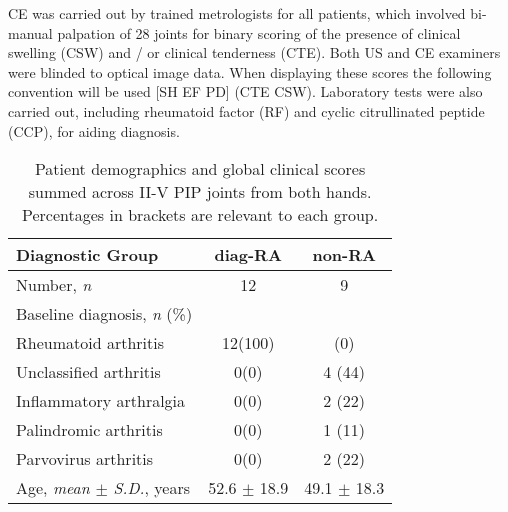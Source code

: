 \documentclass[twoside]{bhamthesis}
\theoremstyle{definition}
\begin{document}
CE was carried out by trained metrologists for all patients, which involved bi-manual palpation of 28 joints for binary scoring of the presence of clinical swelling (CSW) and / or clinical tenderness (CTE). Both US and CE examiners were blinded to optical image data. When displaying these scores the following convention will be used [SH EF PD] (CTE CSW). Laboratory tests were also carried out, including rheumatoid factor (RF) and cyclic citrullinated peptide (CCP), for aiding diagnosis.

\bgroup
\def\arraystretch{1.2}
\begin{table}[!ht]
  \footnotesize
\caption{Patient demographics and global clinical scores summed across II-V PIP joints from both hands. Percentages in brackets are relevant to each group.} 
\label{tab:participant_demographics}
\begin{center}       
\begin{tabular}{l c c} 
\hline
\textbf{Diagnostic Group} &\textbf{ diag-RA} & \textbf{non-RA} \\
\hline
Number, \textit{n} & 12 & 9 \\
Baseline diagnosis, \textit{n} (\%) \\
\hspace{3mm} Rheumatoid arthritis & 12\hspace{1mm}(100) & \hspace{1mm} \hspace{1mm}(0) \\
\hspace{3mm} Unclassified arthritis & 0\hspace{1mm}(0) & 4 \hspace{1mm}(44) \\
\hspace{3mm} Inflammatory arthralgia & 0\hspace{1mm}(0) & 2 \hspace{1mm}(22) \\
\hspace{3mm} Palindromic arthritis  & 0\hspace{1mm}(0) & 1 \hspace{1mm}(11) \\
\hspace{3mm} Parvovirus arthritis & 0\hspace{1mm}(0) & 2 \hspace{1mm}(22) \\
 Age, \textit{mean $\pm$ S.D.}, years & \hspace{1mm} 52.6 $\pm$ 18.9 & \hspace{1mm} 49.1 $\pm$ 18.3 \\

\end{tabular}
\end{center}
\end{table}
\end{document}
